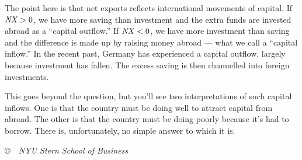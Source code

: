 \documentclass[12pt]{exam}
\newcommand{\NX}{\mbox{\it NX\/}}
\begin{document}
\begin{questions}
\begin{solution}
\begin{parts}
\item The point here is that net exports reflects international
movements of capital.
If $\NX > 0$,  we have more saving
than investment and the extra funds are invested abroad as
a ``capital outflow.''
If $\NX < 0$,  we have more investment than saving
and the difference is made up by raising money abroad ---
what we call a ``capital inflow.''
In the recent past, Germany has experienced a capital outflow,
largely because investment has fallen.
The excess saving is then channelled into foreign investments.

This goes beyond the question, but you'll see two interpretations
of such capital inflows.
One is that the country must be doing well to attract capital from abroad.
The other is that the country must be doing poorly because it's had to borrow.
There is, unfortunately, no simple answer to which it is.

\end{parts}
\end{solution}
\end{questions}



\vfill \centerline{\it \copyright \ \number\year \
NYU Stern School of Business}
\end{document}
